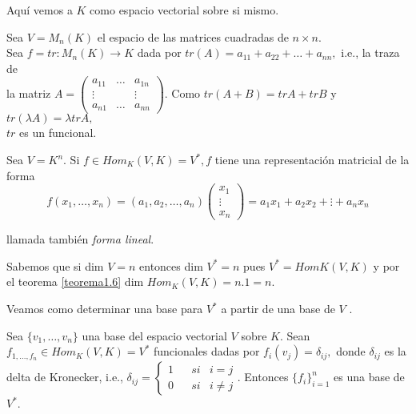 		Aquí vemos a $ K $ como espacio vectorial sobre si mismo.
		
		\begin{ejem}
			\normalfont
			Sea $ V = M_{n}(K) $ el espacio de las matrices cuadradas de $ n \times n $. \\ Sea $ f = tr:M_{n}(K) \rightarrow K $ dada por $ tr(A) = a_{11}+a_{22}+\ldots+a_{nn},$ i.e., la traza de \\ la matriz  $ A = \left(\begin{matrix}
			a_{11} & \ldots & a_{1n} \\ \vdots & & \vdots \\ a_{n1} & \ldots & a_{nn} 
			\end{matrix}\right) $. Como $ tr(A+B) = trA+trB $ y $ tr(\lambda A) = \lambda trA, $ \\ $ tr $ es un funcional.
		\end{ejem}
		\begin{ejem}
				\normalfont
				Sea $ V = K^{n} $. Si $ f \in Hom_{K}(V,K) = V^{*}, f$ tiene una representación matricial de la forma
				\[ f(x_{1},\ldots,x_{n}) = (a_{1},a_{2},\ldots,a_{n})  \left(\begin{array}{c}
						x_{1} \\ \vdots \\ x_{n}
				\end{array}\right) = a_{1}x_{1}+a_{2}x_{2}+\vdots+a_{n}x_{n}\]
				
				llamada también \textit{forma lineal}.
				
				Sabemos que si dim $ V = n $ entonces dim $ V^{*} = n $ pues $ V^{*} = HomK (V, K) $ y por el teorema \ref{teorema1.6} dim $ Hom_{K}(V,K) = n.1 = n.$
				
				Veamos como determinar una base para $ V^{*} $ a partir de una base de $ V $ .
		\end{ejem}
		\begin{pro}
			\normalfont
			Sea $ \{v_{1},\ldots,v_{n}\} $  una base del espacio vectorial $ V $ sobre $ K $.  Sean $ f_{1,\ldots,f_{n}}  \in Hom_{K}(V,K) = V^{*}$ funcionales
			dadas por $ f_{i}(v_{j}) = \delta_{ij}, $ donde $ \delta_{ij} $ es la delta de Kronecker, i.e., $ \delta_{ij} = \left\{\begin{array}{lccc}
			1 &     & si & i=j \\ 0 &     & si & i \not = j
			\end{array}\right. $. Entonces $ \{f_{i}\}^{n}_{i=1} $ es una base de $ V^{*}$.
		\end{pro}
